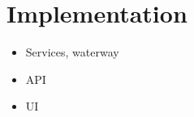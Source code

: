\section{Implementation}

\begin{itemize}
  \item Services, waterway
  \item API
  \item UI
\end{itemize}